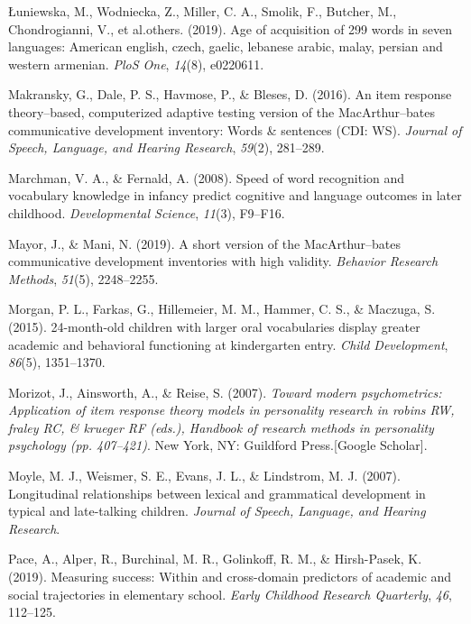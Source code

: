\documentclass[
  man,floatsintext]{apa6}
\newlength{\cslhangindent}
\newlength{\cslentryspacingunit} %
\newenvironment{CSLReferences}[2] %
 {%
  \setlength{\parindent}{0pt}
  \ifodd #1
  \let\oldpar\par
  \def\par{\hangindent=\cslhangindent\oldpar}
  \fi
  \setlength{\parskip}{#2\cslentryspacingunit}
 }%
 {}
\begin{document}
\begin{CSLReferences}{1}{0}
\leavevmode{}%
Łuniewska, M., Wodniecka, Z., Miller, C. A., Smolik, F., Butcher, M., Chondrogianni, V., et al.others. (2019). Age of acquisition of 299 words in seven languages: American english, czech, gaelic, lebanese arabic, malay, persian and western armenian. \emph{PloS One}, \emph{14}(8), e0220611.

\leavevmode{}%
Makransky, G., Dale, P. S., Havmose, P., \& Bleses, D. (2016). An item response theory--based, computerized adaptive testing version of the MacArthur--bates communicative development inventory: Words \& sentences (CDI: WS). \emph{Journal of Speech, Language, and Hearing Research}, \emph{59}(2), 281--289.

\leavevmode{}%
Marchman, V. A., \& Fernald, A. (2008). Speed of word recognition and vocabulary knowledge in infancy predict cognitive and language outcomes in later childhood. \emph{Developmental Science}, \emph{11}(3), F9--F16.

\leavevmode{}%
Mayor, J., \& Mani, N. (2019). A short version of the MacArthur--bates communicative development inventories with high validity. \emph{Behavior Research Methods}, \emph{51}(5), 2248--2255.

\leavevmode{}%
Morgan, P. L., Farkas, G., Hillemeier, M. M., Hammer, C. S., \& Maczuga, S. (2015). 24-month-old children with larger oral vocabularies display greater academic and behavioral functioning at kindergarten entry. \emph{Child Development}, \emph{86}(5), 1351--1370.

\leavevmode{}%
Morizot, J., Ainsworth, A., \& Reise, S. (2007). \emph{Toward modern psychometrics: Application of item response theory models in personality research in robins RW, fraley RC, \& krueger RF (eds.), Handbook of research methods in personality psychology (pp. 407--421)}. New York, NY: Guildford Press.{[}Google Scholar{]}.

\leavevmode{}%
Moyle, M. J., Weismer, S. E., Evans, J. L., \& Lindstrom, M. J. (2007). Longitudinal relationships between lexical and grammatical development in typical and late-talking children. \emph{Journal of Speech, Language, and Hearing Research}.

\leavevmode{}%
Pace, A., Alper, R., Burchinal, M. R., Golinkoff, R. M., \& Hirsh-Pasek, K. (2019). Measuring success: Within and cross-domain predictors of academic and social trajectories in elementary school. \emph{Early Childhood Research Quarterly}, \emph{46}, 112--125.


\end{CSLReferences}
\end{document}
